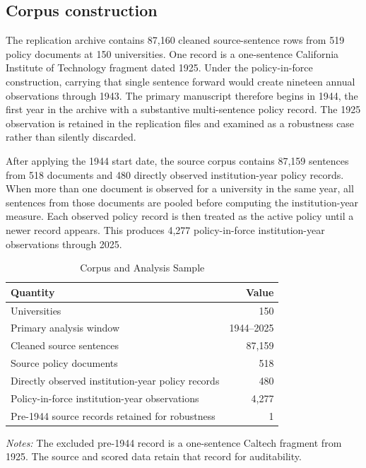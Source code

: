 \documentclass[12pt]{article}
\begin{document}
\subsection{Corpus construction}

The replication archive contains 87,160 cleaned source-sentence rows from 519 policy documents at 150 universities. One record is a one-sentence California Institute of Technology fragment dated 1925. Under the policy-in-force construction, carrying that single sentence forward would create nineteen annual observations through 1943. The primary manuscript therefore begins in 1944, the first year in the archive with a substantive multi-sentence policy record. The 1925 observation is retained in the replication files and examined as a robustness case rather than silently discarded.

After applying the 1944 start date, the source corpus contains 87,159 sentences from 518 documents and 480 directly observed institution-year policy records. When more than one document is observed for a university in the same year, all sentences from those documents are pooled before computing the institution-year measure. Each observed policy record is then treated as the active policy until a newer record appears. This produces 4,277 policy-in-force institution-year observations through 2025.

\begin{table}[H]
\centering
\caption{Corpus and Analysis Sample}
\label{tab:corpus}
\begin{threeparttable}
\small
\begin{tabular}{lr}
\toprule
\textbf{Quantity} & \textbf{Value}\\
\midrule
Universities & 150\\
Primary analysis window & 1944--2025\\
Cleaned source sentences & 87,159\\
Source policy documents & 518\\
Directly observed institution-year policy records & 480\\
Policy-in-force institution-year observations & 4,277\\
Pre-1944 source records retained for robustness & 1\\
\bottomrule
\end{tabular}
\begin{tablenotes}\footnotesize
\item \textit{Notes:} The excluded pre-1944 record is a one-sentence Caltech fragment from 1925. The source and scored data retain that record for auditability.
\end{tablenotes}
\end{threeparttable}
\end{table}
\end{document}

